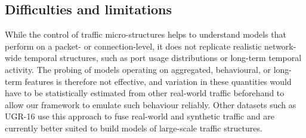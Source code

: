 \documentclass[conference]{IEEEtran}
\begin{document}






\subsection{Difficulties and limitations}

While the control of traffic micro-structures helps to understand models that perform on a packet- or connection-level, it does not replicate realistic network-wide temporal structures, such as port usage distributions or long-term temporal activity. The probing of models operating on aggregated, behavioural, or long-term features is therefore not effective, and variation in these quantities would have to be statistically estimated from other real-world traffic beforehand to allow our framework to emulate such behaviour reliably. Other datasets such as UGR-16 use this approach to fuse real-world and synthetic traffic and are currently better suited to build models of large-scale traffic structures.
\end{document}
